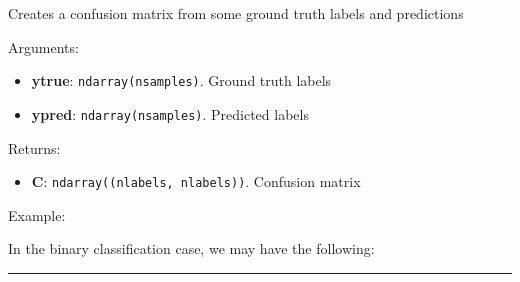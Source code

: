 Creates a confusion matrix from some ground truth labels and predictions

Arguments:

\begin{itemize}
\tightlist
\item
  \textbf{ytrue}: \texttt{ndarray(nsamples)}. Ground truth labels
\item
  \textbf{ypred}: \texttt{ndarray(nsamples)}. Predicted labels
\end{itemize}

Returns:

\begin{itemize}
\tightlist
\item
  \textbf{C}: \texttt{ndarray((nlabels,\ nlabels))}. Confusion matrix
\end{itemize}

Example:

In the binary classification case, we may have the following:

\begin{Shaded}
\begin{Highlighting}[]

\OperatorTok{=}\NormalTok{ np.array([}\NormalTok{, }\NormalTok{, }\NormalTok{, }\NormalTok{, }\NormalTok{])}
\OperatorTok{=}\NormalTok{ np.array([}\NormalTok{, }\NormalTok{, }\NormalTok{, }\NormalTok{, }\NormalTok{])}
\OperatorTok{=}
\OperatorTok{=}
\end{Highlighting}
\end{Shaded}

\begin{center}\rule{0.5\linewidth}{\linethickness}\end{center}
